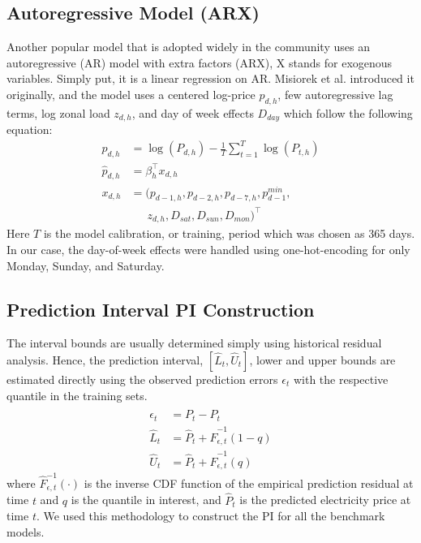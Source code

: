 \documentclass[11pt, letterpaper, journal]{IEEEtran}
\begin{document}
\subsection{Autoregressive Model (ARX)}
Another popular model that is adopted widely in the community uses an autoregressive (AR) model with extra factors (ARX), X stands for exogenous variables. Simply put, it is a linear regression on AR. Misiorek et al. introduced it originally, and the model uses a centered log-price $p_{d,h}$, few autoregressive lag terms, log zonal load $z_{d,h}$, and day of week effects $D_{day}$ which follow the following equation:
\begin{align*}
    p_{d,h} &= \log(P_{d,h}) - \frac{1}{T}\sum_{t=1}^{T} \log(P_{t, h}) \\
    \hat{p}_{d,h} &= \beta_h^{\intercal} x_{d,h} \\
    x_{d, h} &= (p_{d-1,h}, p_{d-2,h}, p_{d-7,h}, p_{d-1}^{min}, \\
             &\quad \,\,\, z_{d,h}, D_{sat}, D_{sun}, D_{mon})^{\intercal}
\end{align*}
Here $T$ is the model calibration, or training, period which was chosen as 365 days. In our case, the day-of-week effects were handled using one-hot-encoding for only Monday, Sunday, and Saturday.

\subsection{Prediction Interval {PI} Construction}
The interval bounds are usually determined simply using historical residual analysis. Hence, the prediction interval, $[\hat{L}_t, \hat{U}_t]$, lower and upper bounds are estimated directly using the observed prediction errors $\epsilon_t$ with the respective quantile in the training sets. 
\begin{align*}
    \epsilon_t &= P_t - \hat{P}_t \\
    \hat{L}_t &= \hat{P}_t + \hat{F}^{-1}_{\epsilon, t}(1-q) \\
    \hat{U}_t &= \hat{P}_t + \hat{F}^{-1}_{\epsilon, t}(q)
\end{align*}
where $\hat{F}^{-1}_{\epsilon, t}(\cdot)$ is the inverse CDF function of the empirical prediction residual at time $t$ and $q$ is the quantile in interest, and $\hat{P}_t$ is the predicted electricity price at time $t$. We used this methodology to construct the PI for all the benchmark models.
\end{document}

